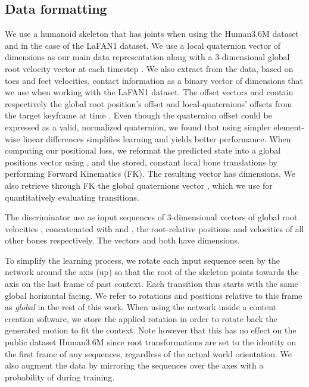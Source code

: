 \documentclass[acmtog]{acmart}
\begin{document}
\subsection{Data formatting}\label{section:data}
We use a humanoid skeleton that has  joints when using the Human3.6M dataset and  in the case of the LaFAN1 dataset. We use a local quaternion vector  of  dimensions as our main data representation along with a 3-dimensional global root velocity vector  at each timestep . 
We also extract from the data, based on toes and feet velocities, contact information as a binary vector  of  dimensions that we use when working with the LaFAN1 dataset.
The offset vectors  and  contain respectively the global root position's offset and local-quaternions' offsets from the target keyframe at time . Even though the quaternion offset could be expressed as a valid, normalized quaternion, we found that using simpler element-wise linear differences simplifies learning and yields better performance. When computing our positional loss, we reformat the predicted state into a global positions vector  using ,  and the stored, constant local bone translations  by performing Forward Kinematics (FK). The resulting vector  has  dimensions. We also retrieve through FK the global quaternions vector , which we use for quantitatively evaluating transitions.


The discriminator use as input sequences of 3-dimensional vectors of global root velocities , concatenated with  and , the root-relative positions and velocities of all other bones respectively. The vectors  and  both have  dimensions.


To simplify the learning process, we rotate each input sequence seen by the network around the  axis (up) so that the root of the skeleton points towards the  axis on the last frame of past context. Each transition thus starts with the same global horizontal facing. We refer to rotations and positions relative to this frame as \textit{global} in the rest of this work. When using the network inside a content creation software, we store the applied rotation in order to rotate back the generated motion to fit the context. Note however that this has no effect on the public dataset Human3.6M since root transformations are set to the identity on the first frame of any sequences, regardless of the actual world orientation. We also augment the data by mirroring the sequences over the  axes with a probability of  during training.
\end{document}
